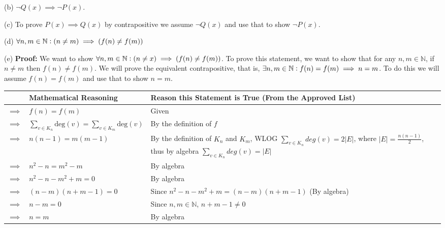 \documentclass{article}
\begin{document}
(b) \hspace{5pt} $\neg Q(x)\implies\neg P(x)$. \vspace{10pt}


(c) To prove $P(x)\implies Q(x)$ by contrapositive we assume $\neg Q(x)$ and use that to show $\neg P(x)$. \vspace{10pt}

(d) $\forall n,m\in\mathbb{N}\vcentcolon (n\neq m)\implies (f(n)\neq f(m))$ \vspace{10pt}

(e) \textbf{Proof:} We want to show $\forall n,m\in\mathbb{N}\vcentcolon (n\neq x)\implies (f(n)\neq f(m))$. To prove this statement, we want to show that for any $n,m\in\mathbb{N}$, if $n\neq m$ then $f(n)\neq f(m)$.  We will prove the equivalent contrapositive, that is, $\exists n,m\in\mathbb{N}\vcentcolon f(n)=f(m)\implies n=m$.  To do this we will assume $f(n)=f(m)$ and use that to show $n=m$. \vspace{10pt} 

\begin{flushleft}
	\begin{tabular}{|p{0.5cm}|p{5.8cm}|p{6.2cm}|}
		\hline
		 & \textbf{Mathematical Reasoning} & \textbf{Reason this Statement is True (From the Approved List)} \\
		\hline
		$\implies$ & $f(n)=f(m)$ & Given \\
		\hline
		$\implies$ & $\sum_{v\in K_n} \text{deg}(v) = \sum_{v\in K_m} \text{deg}(v)$ & By the definition of $f$ \\
		\hline
		$\implies$ & $n(n-1)=m(m-1)$ & By the definition of $K_n$ and $K_m$, WLOG $\sum_{v\in K_n} deg(v)=2|E|$, where $|E| = \frac{n(n-1)}{2}$, thus by algebra $\sum_{v\in K_n} deg(v)=|E|$\vspace{5pt} \\
		\hline
		$\implies$ & $n^2-n=m^2-m$ & By algebra \\
		\hline
		$\implies$ & $n^2-n-m^2+m=0$ & By algebra \\
		\hline
		$\implies$ & $(n-m)(n+m-1)=0$ & Since $n^2-n-m^2+m=(n-m)(n+m-1)$ (By algebra) \\
		\hline
		$\implies$ & $n-m=0$ & Since $n,m\in\mathbb{N}$, $n+m-1\neq 0$ \\
		\hline
		$\implies$ & $n=m$ & By algebra \\
		\hline

	\end{tabular}
\end{flushleft}\vspace{15pt}
\end{document}
